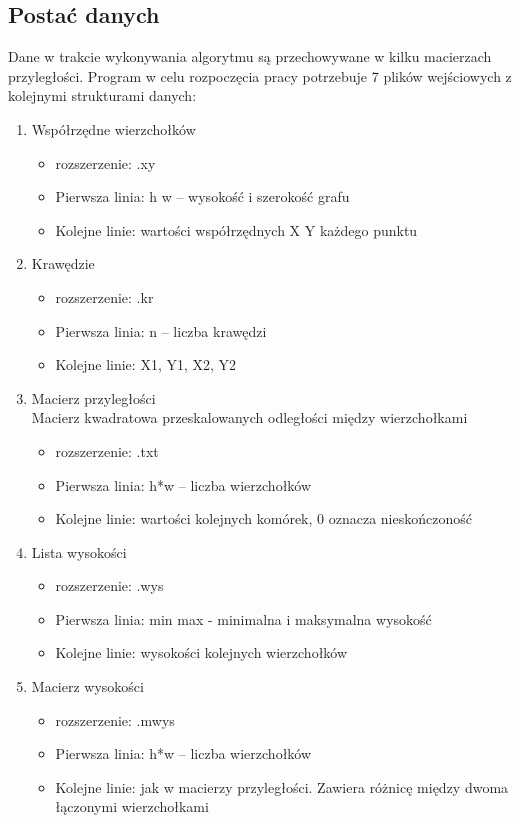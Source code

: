 \documentclass[12pt,a4paper]{article}
\begin{document}
\subsection{Postać danych}
Dane w trakcie wykonywania algorytmu są przechowywane w kilku macierzach przyległości. Program w celu rozpoczęcia pracy potrzebuje 7 plików wejściowych z kolejnymi strukturami danych:
\begin{enumerate}
\item Współrzędne wierzchołków
	\begin{itemize}
	\item rozszerzenie: .xy
	\item Pierwsza linia: h w -- wysokość i szerokość grafu
	\item Kolejne linie: wartości współrzędnych X Y każdego punktu
	\end{itemize}
\item Krawędzie
	\begin{itemize}
	\item rozszerzenie: .kr
	\item Pierwsza linia: n -- liczba krawędzi
	\item Kolejne linie: X1, Y1, X2, Y2
	\end{itemize}
\item Macierz przyległości\\
Macierz kwadratowa przeskalowanych odległości między wierzchołkami
	\begin{itemize}
	\item rozszerzenie: .txt
	\item Pierwsza linia: h*w -- liczba wierzchołków
	\item Kolejne linie: wartości kolejnych komórek, 0 oznacza nieskończoność
	\end{itemize}
\item Lista wysokości
	\begin{itemize}
	\item rozszerzenie: .wys
	\item Pierwsza linia: min max - minimalna i maksymalna wysokość
	\item Kolejne linie: wysokości kolejnych wierzchołków
	\end{itemize}
\item Macierz wysokości
	\begin{itemize}
	\item rozszerzenie: .mwys
	\item Pierwsza linia: h*w -- liczba wierzchołków
	\item Kolejne linie: jak w macierzy przyległości. Zawiera różnicę między dwoma łączonymi wierzchołkami

\end{itemize}
\end{enumerate}
\end{document}

